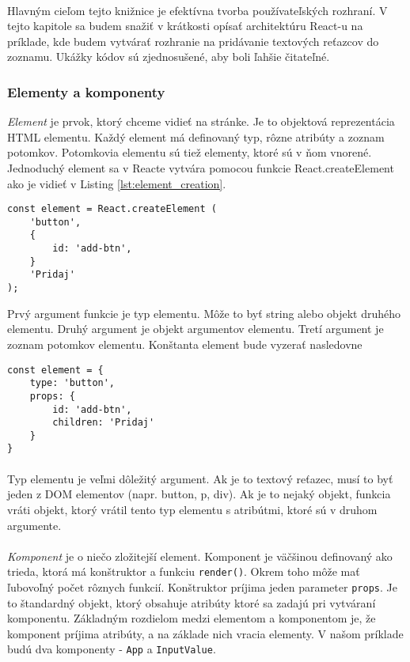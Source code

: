 \paragraph{}
Hlavným cieľom tejto knižnice je efektívna tvorba používateľských rozhraní. V tejto kapitole sa budem snažiť v krátkosti opísať architektúru React-u na príklade, kde budem vytvárať rozhranie na pridávanie textových reťazcov do zoznamu. Ukážky kódov sú zjednosušené, aby boli ľahšie čitateľné.

\subsubsection{Elementy a komponenty}
\emph{Element} je prvok, ktorý chceme vidieť na stránke. Je to objektová reprezentácia HTML elementu. Každý element má definovaný typ, rôzne atribúty a zoznam potomkov. Potomkovia elementu sú tiež elementy, ktoré sú v ňom vnorené. Jednoduchý element sa v Reacte vytvára pomocou funkcie React.createElement ako je vidieť v Listing \ref{lst:element_creation}.
\begin{lstlisting}[caption={Vytvorenie jednoduchého elementu}, label={lst:element_creation}]
const element = React.createElement (
    'button',
    {
        id: 'add-btn',
    }
    'Pridaj'
);
\end{lstlisting}
Prvý argument funkcie je typ elementu. Môže to byť string alebo objekt druhého elementu. Druhý argument je objekt argumentov elementu. Tretí argument je zoznam potomkov elementu. Konštanta element bude vyzerať nasledovne
\begin{lstlisting}
const element = {
    type: 'button',
    props: {
        id: 'add-btn',
        children: 'Pridaj'
    }
}
\end{lstlisting}
\paragraph{}
Typ elementu je veľmi dôležitý argument. Ak je to textový reťazec, musí to byť jeden z DOM elementov (napr. button, p, div). Ak je to nejaký objekt, funkcia vráti objekt, ktorý vrátil tento typ elementu s atribútmi, ktoré sú v druhom argumente.
\paragraph{}
\emph{Komponent} je o niečo zložitejší element. Komponent je väčšinou definovaný ako trieda, ktorá má konštruktor a funkciu \texttt{render()}. Okrem toho môže mať ľubovoľný počet rôznych funkcií. Konštruktor príjima jeden parameter \texttt{props}. Je to štandardný objekt, ktorý obsahuje atribúty ktoré sa zadajú pri vytváraní komponentu. Základným rozdielom medzi elementom a komponentom je, že komponent príjima atribúty, a na základe nich vracia elementy. V našom príklade budú dva komponenty - \texttt{App} a \texttt{InputValue}.
